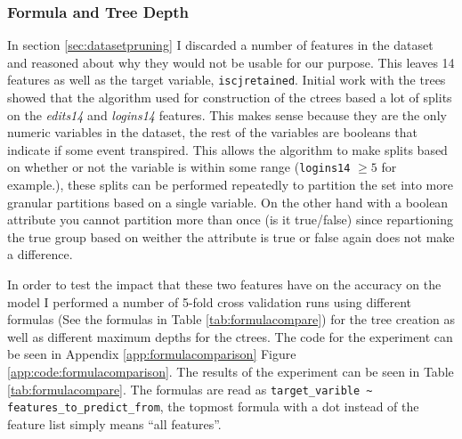\subsubsection{Formula and Tree Depth}
\label{sec:formcompare}

In section \ref{sec:datasetpruning} I discarded a number of features in the
dataset and reasoned about why they would not be usable for our purpose. This
leaves 14 features as well as the target variable, \texttt{iscjretained}.
Initial work with the trees showed that the algorithm used for construction of
the ctrees based a lot of splits on the \textit{edits14} and \textit{logins14}
features. This makes sense because they are the only numeric variables in the
dataset, the rest of the variables are booleans that indicate if some event
transpired. This allows the algorithm to make splits based on whether or not the
variable is within some range (\texttt{logins14} $\geq 5$ for example.), these
splits can be performed repeatedly to partition the set into more granular
partitions based on a single variable. On the other hand with a boolean
attribute you cannot partition more than once (is it true/false) since
repartioning the true group based on weither the attribute is true or false
again does not make a difference.

In order to test the impact that these two features have on the accuracy on the
model I performed a number of 5-fold cross validation runs using different
formulas (See the formulas in Table \ref{tab:formulacompare}) for the tree
creation as well as different maximum depths for the ctrees. The code for the
experiment can be seen in Appendix \ref{app:formulacomparison} Figure
\ref{app:code:formulacomparison}. The results of the experiment can be seen in
Table \ref{tab:formulacompare}. The formulas are read as \texttt{target\_varible
\~{} features\_to\_predict\_from}, the topmost formula with a dot instead of the
feature list simply means ``all features''.


